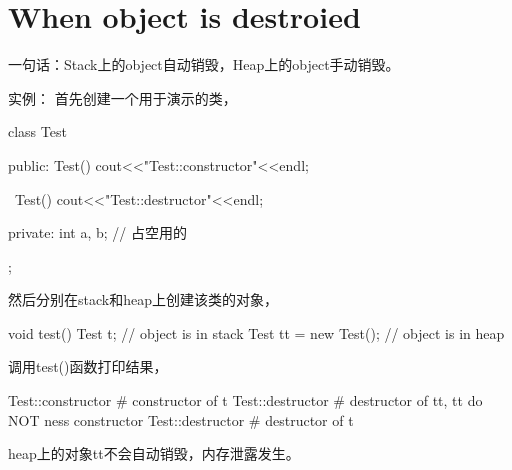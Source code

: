 ﻿\section[When destroy object]{When object is destroied}
一句话：Stack上的object自动销毁，Heap上的object手动销毁。

实例：
首先创建一个用于演示的类，\\
\begin{cppcode}
class Test {
public:
    Test() {
      cout<<"Test::constructor"<<endl;
    }

    ~Test() {
      cout<<"Test::destructor"<<endl;
    }

private:
    int a, b; // 占空用的
};
\end{cppcode}

然后分别在stack和heap上创建该类的对象，

\begin{cppcode}
void test() {
    Test t; // object is in stack
    Test tt = new Test(); // object is in heap
}
\end{cppcode}

调用test()函数打印结果，

\begin{bashcode}
Test::constructor # constructor of t
Test::destructor # destructor of tt, tt do NOT ness constructor
Test::destructor  # destructor of t
\end{bashcode}

heap上的对象tt不会自动销毁，内存泄露发生。